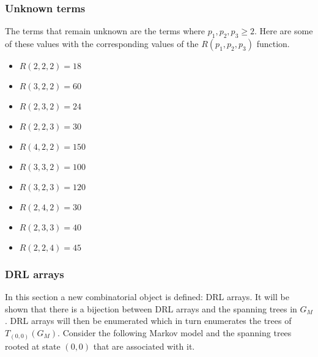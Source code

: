 \subsubsection{Unknown terms}

The terms that remain unknown are the terms where \(p_1, p_2, p_3 \geq 2\). 
Here are some of these values with the corresponding values of the \(R(p_1,p_2,p_3)\) function.

\begin{multicols}{2}
    \begin{itemize}
        \item \(R(2,2,2) = 18\) 
        \item \(R(3,2,2) = 60\)
        \item \(R(2,3,2) = 24\)
        \item \(R(2,2,3) = 30\)
        \item \(R(4,2,2) = 150\)
        \item \(R(3,3,2) = 100\)
        \item \(R(3,2,3) = 120\)
        \item \(R(2,4,2) = 30\)
        \item \(R(2,3,3) = 40\)
        \item \(R(2,2,4) = 45\)
    \end{itemize}
\end{multicols}

\subsubsection{DRL arrays}

In this section a new combinatorial object is defined: DRL arrays. 
It will be shown that there is a bijection between DRL arrays and the spanning trees in \(G_M\).
DRL arrays will then be enumerated which in turn enumerates the trees of \(T_{(0,0)}(G_M)\).
Consider the following Markov model and the spanning trees rooted at state \((0,0)\) that are associated with it. 

\begin{figure}[h]
    \centering
    \scalebox{0.8}{} \vspace{0.8cm} \\
    \scalebox{0.6}{} \hspace{0.7cm}
    \scalebox{0.6}{} \vspace{0.4cm} \\
    \scalebox{0.6}{} \hspace{0.7cm}
    \scalebox{0.6}{}\vspace{0.4cm} \\
    \scalebox{0.6}{}
\end{figure}

